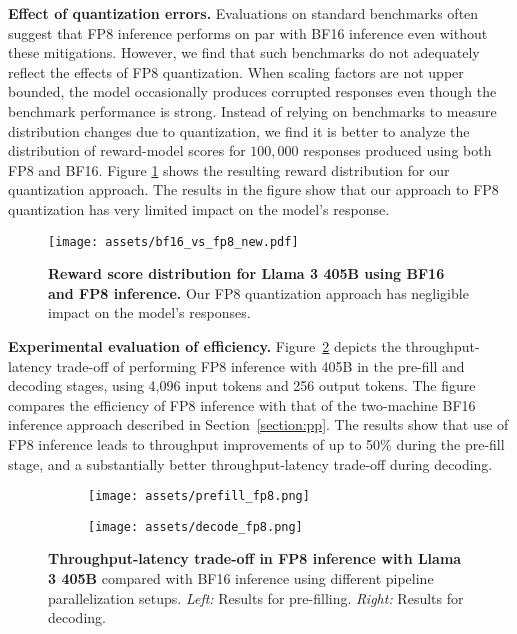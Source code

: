 \textbf{Effect of quantization errors.} Evaluations on standard benchmarks often suggest that FP8 inference performs on par with BF16 inference even without these mitigations.
However, we find that such benchmarks do not adequately reflect the effects of FP8 quantization.
When scaling factors are not upper bounded, the model occasionally produces corrupted responses even though the benchmark performance is strong.
Instead of relying on benchmarks to measure distribution changes due to quantization, we find it is better to analyze the distribution of reward-model scores for $100,000$ responses produced using both FP8 and BF16.
Figure \ref{figure:reward-scores} shows the resulting reward distribution for our quantization approach.
The results in the figure show that our approach to FP8 quantization has very limited impact on the model's response. 

\begin{figure}[t]
\centering
\texttt{[image: assets/bf16\_vs\_fp8\_new.pdf]}
\caption{\textbf{Reward score distribution for Llama 3 405B using BF16 and FP8 inference.} Our FP8 quantization approach has negligible impact on the model's responses.}
\label{figure:reward-scores}
\end{figure}

\textbf{Experimental evaluation of efficiency.}
Figure~\ref{figure:fp8_speed} depicts the throughput-latency trade-off of performing FP8 inference with \llamathree 405B in the pre-fill and decoding stages, using 4,096 input tokens and 256 output tokens.
The figure compares the efficiency of FP8 inference with that of the two-machine BF16 inference approach described in Section~\ref{section:pp}.
The results show that use of FP8 inference leads to throughput improvements of up to 50$\%$ during the pre-fill stage, and a substantially better throughput-latency trade-off during decoding.

\begin{figure}
\centering
  \begin{subfigure}{.5\textwidth}
    \centering
    \texttt{[image: assets/prefill\_fp8.png]}
  \end{subfigure}%
  \begin{subfigure}{.5\textwidth}
    \centering
    \texttt{[image: assets/decode\_fp8.png]}
  \end{subfigure}
  \caption{\textbf{Throughput-latency trade-off in FP8 inference with Llama 3 405B} compared with BF16 inference using different pipeline parallelization setups. \emph{Left:} Results for pre-filling. \emph{Right:} Results for decoding.}
  \label{figure:fp8_speed}
\end{figure}
